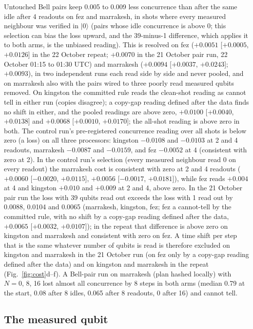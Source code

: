 \documentclass[reprint,amsmath,amssymb,aps,superscriptaddress,nofootinbib]{revtex4-2}
\begin{document}
Untouched Bell pairs keep 0.005 to 0.009 less concurrence than after the same idle after 4 readouts on fez and marrakesh, in shots where every measured neighbour was verified in $|0\rangle$ (pairs whose idle concurrence is above 0; this selection can bias the loss upward, and the 39-minus-1 difference, which applies it to both arms, is the unbiased reading). This is resolved on fez ($+0.0051$ [$+0.0005$, $+0.0126$] in the 22 October repeat; $+0.0070$ in the 21 October pair run, 22 October 01:15 to 01:30 UTC) and marrakesh ($+0.0094$ [$+0.0037$, $+0.0243$]; $+0.0093$), in two independent runs each read side by side and never pooled, and on marrakesh also with the pairs wired to three poorly read measured qubits removed. On kingston the committed rule reads the clean-shot reading as cannot tell in either run (copies disagree); a copy-gap reading defined after the data finds no shift in either, and the pooled readings are above zero, $+0.0100$ [$+0.0040$, $+0.0138$] and $+0.0068$ [$+0.0010$, $+0.0170$]; the all-shot reading is above zero in both. The control run's pre-registered concurrence reading over all shots is below zero (a loss) on all three processors: kingston $-0.0108$ and $-0.0103$ at 2 and 4 readouts, marrakesh $-0.0087$ and $-0.0159$, and fez $-0.0052$ at 4 (consistent with zero at 2). In the control run's selection (every measured neighbour read 0 on every readout) the marrakesh cost is consistent with zero at 2 and 4 readouts ($+0.0060$ [$-0.0020$, $+0.0115$], $+0.0056$ [$-0.0017$, $+0.0181$]), while fez reads $+0.004$ at 4 and kingston $+0.010$ and $+0.009$ at 2 and 4, above zero. In the 21 October pair run the loss with 39 qubits read out exceeds the loss with 1 read out by 0.0088, 0.0104 and 0.0065 (marrakesh, kingston, fez; fez a cannot-tell by the committed rule, with no shift by a copy-gap reading defined after the data, $+0.0065$ [$+0.0032$, $+0.0107$]); in the repeat that difference is above zero on kingston and marrakesh and consistent with zero on fez. A time shift per step that is the same whatever number of qubits is read is therefore excluded on kingston and marrakesh in the 21 October run (on fez only by a copy-gap reading defined after the data) and on kingston and marrakesh in the repeat (Fig.~\ref{fig:cost}d--f). A Bell-pair run on marrakesh (plan hashed locally) with $N=0$, 8, 16 lost almost all concurrence by 8 steps in both arms (median 0.79 at the start, 0.08 after 8 idles, 0.065 after 8 readouts, 0 after 16) and cannot tell.

\subsection{The measured qubit}\label{sec:measured}
\end{document}
